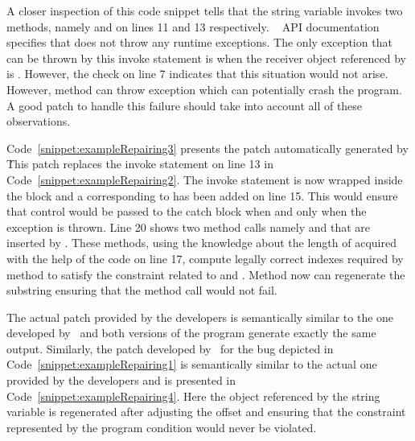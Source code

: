 A closer inspection of this code snippet tells that the string variable  invokes two
methods, namely  and  on lines 11 and 13 respectively. \java\  API documentation
specifies that  does not throw any runtime exceptions. The only exception that can be thrown
by this invoke statement is when the receiver object referenced by  is . However,
the check on line 7 indicates that this situation would not arise. However, method  can throw
 exception which can potentially crash the program. A good patch to handle
this failure should take into account all of these observations. 

Code~\ref{snippet:exampleRepairing3} presents the patch automatically
generated by \tool\. This patch replaces the invoke statement on line 13 in Code~\ref{snippet:exampleRepairing2}.
The invoke statement is now wrapped inside the  block and a  corresponding to 
has been added on line 15. This would ensure that control would be passed to the catch block when and only when the exception is thrown.
Line 20 shows two method calls namely  and  that are inserted by \tool. 
These methods, using the knowledge about the length of  acquired with the help of the code on line 17,
compute legally correct indexes required by  method to satisfy the constraint related to 
and . Method  now can regenerate the substring ensuring that the method call would not fail. 

The actual patch provided by the developers is semantically similar to the one developed by \tool\ and both versions
of the program generate exactly the same output. Similarly, the patch developed 
by \tool\ for the bug depicted in Code~\ref{snippet:exampleRepairing1}
is semantically similar to the actual one provided by the developers and is presented in
Code~\ref{snippet:exampleRepairing4}. Here the object referenced by the string
variable  is regenerated after adjusting the offset and ensuring that the constraint represented by the
program condition 
would never be violated.


